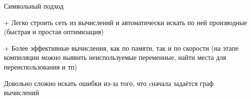 \documentclass[notes,12pt, aspectratio=169]{beamer}
\newenvironment{wideitemize}{\itemize\addtolength{\itemsep}{10pt}}{\enditemize}
\begin{document}
\begin{frame}{Символьный подход}
\begin{wideitemize}
\item[+] Легко строить сеть из вычислений и автоматически искать по ней производные \alert{(быстрая и простая оптимизация)}

\item[+] Более эффективные вычисления, как по памяти, так и по скорости (на этапе компиляции можно выявить неиспользуемые переменные, найти места для переиспользования и тп)

\item Довольно сложно искать ошибки из-за того, что cначала задаётся граф вычислений
\end{wideitemize}
\end{frame}
\end{document}
